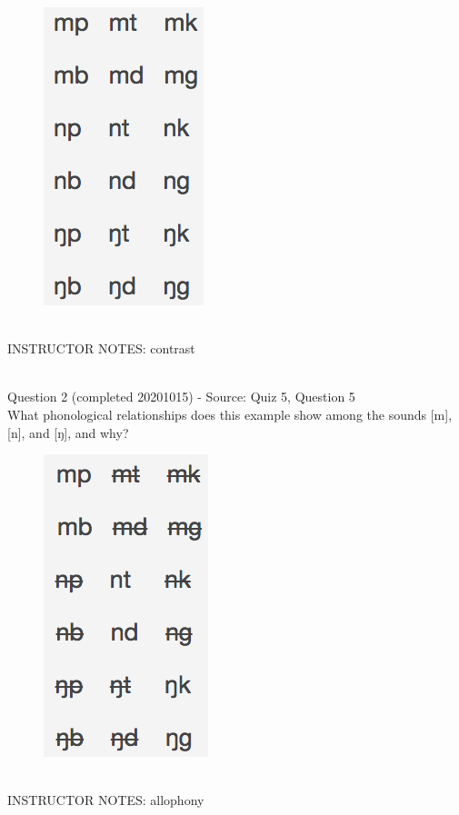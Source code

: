 \documentclass[12pt]{article}
\begin{document}
\begin{figure}[H]
\includegraphics{../images/quiz4question5_a.png}
\end{figure}

~\\
INSTRUCTOR NOTES: contrast


~\\

{\large Question 2} (completed 20201015) - Source: Quiz 5, Question 5\\

What phonological relationships does this example show among the sounds [m], [n], and [ŋ], and why?\\

\begin{figure}[H]
\includegraphics{../images/quiz4question5_b.png}
\end{figure}

~\\
INSTRUCTOR NOTES: allophony
\end{document}
